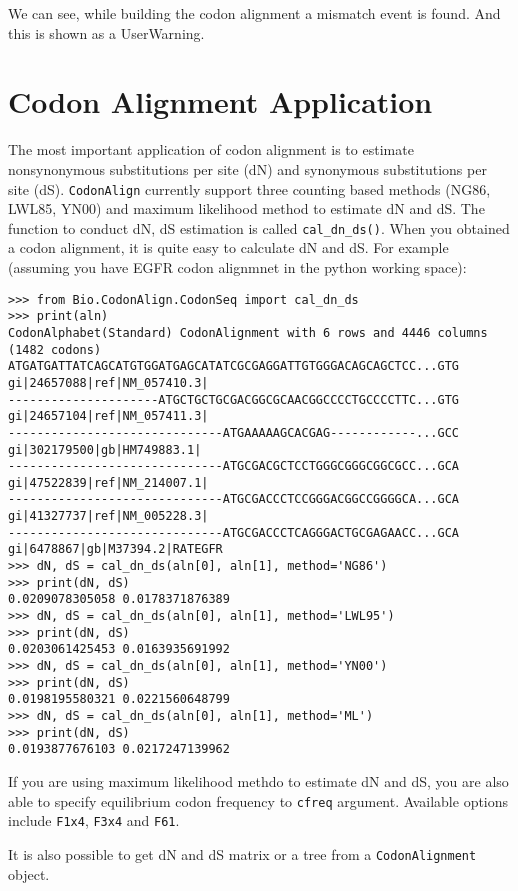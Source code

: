 We can see, while building the codon alignment a mismatch event is
found. And this is shown as a UserWarning.

\section{Codon Alignment Application}
\label{subsec:app}

The most important application of codon alignment is to estimate
nonsynonymous substitutions per site (dN) and synonymous substitutions
per site (dS). \verb|CodonAlign| currently support three counting
based methods (NG86, LWL85, YN00) and maximum likelihood method to
estimate dN and dS. The function to conduct dN, dS estimation is called
\verb|cal_dn_ds()|. When you obtained a codon alignment, it is quite
easy to calculate dN and dS. For example (assuming you have EGFR codon
alignmnet in the python working space):

\begin{verbatim}
>>> from Bio.CodonAlign.CodonSeq import cal_dn_ds
>>> print(aln)
CodonAlphabet(Standard) CodonAlignment with 6 rows and 4446 columns (1482 codons)
ATGATGATTATCAGCATGTGGATGAGCATATCGCGAGGATTGTGGGACAGCAGCTCC...GTG gi|24657088|ref|NM_057410.3|
---------------------ATGCTGCTGCGACGGCGCAACGGCCCCTGCCCCTTC...GTG gi|24657104|ref|NM_057411.3|
------------------------------ATGAAAAAGCACGAG------------...GCC gi|302179500|gb|HM749883.1|
------------------------------ATGCGACGCTCCTGGGCGGGCGGCGCC...GCA gi|47522839|ref|NM_214007.1|
------------------------------ATGCGACCCTCCGGGACGGCCGGGGCA...GCA gi|41327737|ref|NM_005228.3|
------------------------------ATGCGACCCTCAGGGACTGCGAGAACC...GCA gi|6478867|gb|M37394.2|RATEGFR
>>> dN, dS = cal_dn_ds(aln[0], aln[1], method='NG86')
>>> print(dN, dS)
0.0209078305058 0.0178371876389
>>> dN, dS = cal_dn_ds(aln[0], aln[1], method='LWL95')
>>> print(dN, dS)
0.0203061425453 0.0163935691992
>>> dN, dS = cal_dn_ds(aln[0], aln[1], method='YN00')
>>> print(dN, dS)
0.0198195580321 0.0221560648799
>>> dN, dS = cal_dn_ds(aln[0], aln[1], method='ML')
>>> print(dN, dS)
0.0193877676103 0.0217247139962
\end{verbatim}

If you are using maximum likelihood methdo to estimate dN and dS, you
are also able to specify equilibrium codon frequency to \texttt{cfreq}
argument. Available options include \texttt{F1x4}, \texttt{F3x4} and
\texttt{F61}.

It is also possible to get dN and dS matrix or a tree from a
\verb|CodonAlignment| object.


